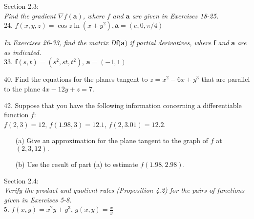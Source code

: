\documentclass[12pt,letterpaper]{hmcpset}
\begin{document}

\begin{problem}
Section 2.3: 
\\
\textit{Find the gradient $\nabla f(\mathbf{a})$, where $f$ and $\mathbf{a}$ are given in Exercises 18-25.}
\\
24. $f(x,y,z)=\cos{z \ln{\left(x+y^2\right)}}, \mathbf{a} = (e, 0, \pi/4)$
\end{problem}

\newpage

\begin{problem}
\textit{In Exercises 26-33, find the matrix D}\textbf{f}(\textbf{a})\textit{ if partial derivatives, where }\textbf{f}\textit{ and} \textbf{a} \textit{ are as indicated.}
\\
33. \textbf{f}$(s, t)=(s^2, st, t^2)$, \textbf{a}$=(-1,1)$
\end{problem}

\newpage


\begin{problem}
40. Find the equations for the planes tangent to $z=x^2-6x+y^3$ that are parallel to the plane $4x-12y+z=7$.
\end{problem}

\newpage


\begin{problem}
42. Suppose that you have the following information concerning a differentiable function $f$:\\
$f(2,3)=12$, $f(1.98,3)=12.1$, $f(2,3.01)=12.2.$
\begin{enumerate}
    \item[(a)] Give an approximation for the plane tangent to the graph of $f$ at $(2,3,12).$
    \item[(b)] Use the result of part (a) to estimate $f(1.98, 2.98).$
\end{enumerate}

\end{problem}

\newpage


\begin{problem}
Section 2.4:
\\
\textit{Verify the product and quotient rules (Proposition 4.2) for the pairs of functions given in Exercises 5-8.}
\\
5. $f(x,y)=x^2y+y^3$, $g(x,y)=\frac{x}{y}$
\end{problem}
\end{document}
